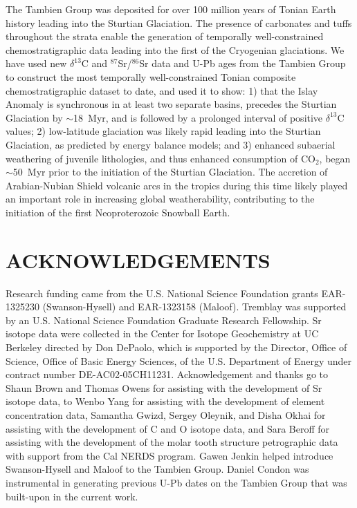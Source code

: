 \documentclass[11pt,letterpaper]{article}
\newcommand{\dC}{$\delta^{13}$C\xspace}
\newcommand{\SrSr}{$^{87}$Sr/$^{86}$Sr\xspace}
\begin{document}
The Tambien Group was deposited for over 100 million years of Tonian Earth history leading into the Sturtian Glaciation. The presence of carbonates and tuffs throughout the strata enable the generation of temporally well-constrained chemostratigraphic data leading into the first of the Cryogenian glaciations. We have used new \dC and \SrSr data and U-Pb ages from the Tambien Group to construct the most temporally well-constrained Tonian composite chemostratigraphic dataset to date, and used it to show: 1) that the Islay Anomaly is synchronous in at least two separate basins, precedes the Sturtian Glaciation by $\sim$18~Myr, and is followed by a prolonged interval of positive \dC values; 2) low-latitude glaciation was likely rapid leading into the Sturtian Glaciation, as predicted by energy balance models; and 3) enhanced subaerial weathering of juvenile lithologies, and thus enhanced consumption of CO$_{2}$, began $\sim$50~Myr prior to the initiation of the Sturtian Glaciation. The accretion of Arabian-Nubian Shield volcanic arcs in the tropics during this time likely played an important role in increasing global weatherability, contributing to the initiation of the first Neoproterozoic Snowball Earth.

\section*{ACKNOWLEDGEMENTS \label{sec:ACKNOWLEDGEMENTS}}
\footnotesize

Research funding came from the U.S. National Science Foundation grants EAR-1325230 (Swanson-Hysell) and EAR-1323158 (Maloof). Tremblay was supported by an U.S. National Science Foundation Graduate Research Fellowship. Sr isotope data were collected in the Center for Isotope Geochemistry at UC Berkeley directed by Don DePaolo, which is supported by the Director, Office of Science, Office of Basic Energy Sciences, of the U.S. Department of Energy under contract number DE-AC02-05CH11231. Acknowledgement and thanks go to Shaun Brown and Thomas Owens for assisting with the development of Sr isotope data, to Wenbo Yang for assisting with the development of element concentration data, Samantha Gwizd, Sergey Oleynik, and Disha Okhai for assisting with the development of C and O isotope data, and Sara Beroff for assisting with the development of the molar tooth structure petrographic data with support from the Cal NERDS program. Gawen Jenkin helped introduce Swanson-Hysell and Maloof to the Tambien Group. Daniel Condon was instrumental in generating previous U-Pb dates on the Tambien Group that was built-upon in the current work.

\singlespacing



\end{document}

